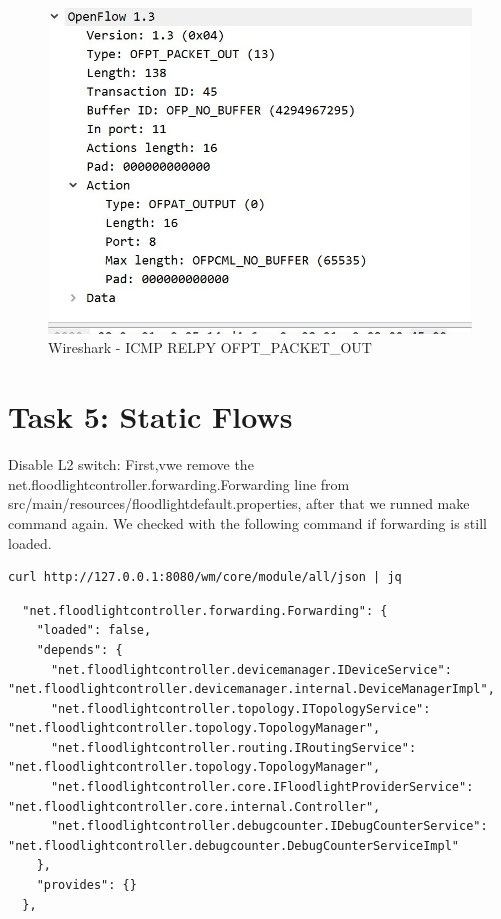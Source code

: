 \documentclass[a4paper]{article}
\begin{document}
\begin{figure}[h]
    \centering
    \includegraphics[scale=0.2]{images/ICMPREPLY.jpg}
    \caption{Wireshark - ICMP RELPY OFPT\_PACKET\_OUT}
    \label{fig:ICMPREPLY}
\end{figure}


\newpage
\section{Task 5: Static Flows}
\label{sec:task5}

Disable L2 switch:
\noindent
First,vwe remove the net.floodlightcontroller.forwarding.Forwarding line from src/main/resources/floodlightdefault.properties, after that we runned make command again. We checked with the following command if forwarding is still loaded.

\begin{verbatim}
curl http://127.0.0.1:8080/wm/core/module/all/json | jq
\end{verbatim}
\begin{verbatim}
  "net.floodlightcontroller.forwarding.Forwarding": {
    "loaded": false,
    "depends": {
      "net.floodlightcontroller.devicemanager.IDeviceService": "net.floodlightcontroller.devicemanager.internal.DeviceManagerImpl",
      "net.floodlightcontroller.topology.ITopologyService": "net.floodlightcontroller.topology.TopologyManager",
      "net.floodlightcontroller.routing.IRoutingService": "net.floodlightcontroller.topology.TopologyManager",
      "net.floodlightcontroller.core.IFloodlightProviderService": "net.floodlightcontroller.core.internal.Controller",
      "net.floodlightcontroller.debugcounter.IDebugCounterService": "net.floodlightcontroller.debugcounter.DebugCounterServiceImpl"
    },
    "provides": {}
  },
\end{verbatim}
\end{document}
